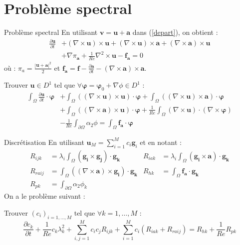 \documentclass{beamer}
\newcommand{\grad}{{\nabla}}
\newcommand{\rot}{{\nabla\times}}
\newcommand{\rott}{{\nabla^2\times}}
\begin{document}
\section{Problème spectral}
\begin{frame}{Problème spectral}
En utilisant $\mathbf{v}=\mathbf{u}+\mathbf{a}$ dans (\ref{depart}), on obtient :
\begin{align*}
\frac{\partial \mathbf{u}}{\partial t} &+ (\rot \mathbf{u})\times \mathbf{u} + (\rot \mathbf{u})\times \mathbf{a} + \left(\rot \mathbf{a}\right)\times \mathbf{u} \\
&+ \grad\pi_\mathbf{a} + \frac{1}{Re}\rott \mathbf{u} - \mathbf{f_a} = 0
\end{align*}
où : $\pi_a=\frac{|\mathbf{u}+\mathbf{a}|^2}{2}$ et $\mathbf{f_a}=\mathbf{f}-\frac{\partial \mathbf{a}}{\partial t}-(\rot\mathbf{a})\times\mathbf{a}$.
\begin{block}{Trouver $\mathbf{u}\in D^1$ tel que $\forall \bm{\varphi}=\bm{\varphi}_0+\grad\phi\in D^1$ :}
\begin{align*}
\int_\Omega \frac{\partial \mathbf{u}}{\partial t}\cdot \bm{\varphi} &+ \int_\Omega ((\rot \mathbf{u})\times \mathbf{u})\cdot \bm{\varphi} + \int_\Omega ((\rot \mathbf{u})\times \mathbf{a})\cdot\bm{\varphi} \\
&+ \int_\Omega ((\rot \mathbf{a})\times \mathbf{u})\cdot\bm{\varphi} + \frac{1}{Re}\int_\Omega (\rot \mathbf{u})\cdot(\rot\bm{\varphi}) \\
&-\frac{1}{Re}\int_{\partial\Omega} \alpha_2\phi = \int_\Omega \mathbf{f_a}\cdot\bm{\varphi}
\end{align*}
\end{block}
\end{frame}

\begin{frame}{Discrétisation}
En utilisant $\mathbf{u}_M=\sum_{i=1}^M c_i\mathbf{g}_i$ et en notant :
\begin{align*}
R_{ijk} &= \lambda_i\int_\Omega(\mathbf{g_i}\times \mathbf{g_j})\cdot\mathbf{g_k} & R_{iak} &= \lambda_i\int_\Omega(\mathbf{g_i}\times \mathbf{a})\cdot\mathbf{g_k}\\
R_{raij} &= \int_\Omega((\rot\mathbf{a})\times \mathbf{g_i})\cdot\mathbf{g_k} & R_{hk} &= \int_\Omega\mathbf{f_a}\cdot\mathbf{g_k}\\
R_{pk} &= \int_{\partial\Omega} \alpha_2\phi_k
\end{align*}
On a le problème suivant :
\begin{block}{Trouver $(c_i)_{i=1,\dots,M}$ tel que $\forall k=1,\dots,M$ :}
\[ \frac{\partial c_k}{\partial t} + \frac{1}{Re}c_k\lambda_k^2 + \sum_{i,j=1}^Mc_ic_jR_{ijk} + \sum_{i=1}^Mc_i\left(R_{iak} + R_{raij}\right) = R_{hk} + \frac{1}{Re}R_{pk} \]
\end{block}
\end{frame}
\end{document}
